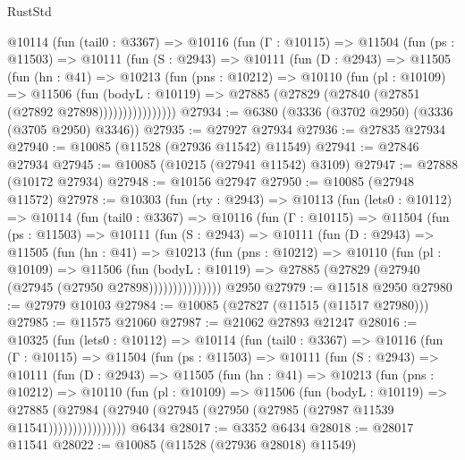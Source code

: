 \begin{lexlean}{RustStd}
\begin{coremodule}
        @10114
          (fun (tail0 : @3367) =>
          @10116
            (fun (Γ : @10115) =>
            @11504
              (fun (ps : @11503) =>
              @10111
                (fun (S : @2943) =>
                @10111
                  (fun (D : @2943) =>
                  @11505
                    (fun (hn : @41) =>
                    @10213
                      (fun (pns : @10212) =>
                      @10110
                        (fun (pl : @10109) =>
                        @11506
                          (fun (bodyL : @10119) =>
                          @27885 (@27829 (@27840 (@27851 (@27892 @27898))))))))))))))))
@27934 := @6380 (@3336 (@3702 @2950) (@3336 (@3705 @2950) @3346))
@27935 := @27927 @27934
@27936 := @27835 @27934
@27940 := @10085 (@11528 (@27936 @11542) @11549)
@27941 := @27846 @27934
@27945 := @10085 (@10215 (@27941 @11542) @3109)
@27947 := @27888 (@10172 @27934)
@27948 := @10156 @27947
@27950 := @10085 (@27948 @11572)
@27978 := @10303
    (fun (rty : @2943) =>
    @10113
      (fun (lets0 : @10112) =>
      @10114
        (fun (tail0 : @3367) =>
        @10116
          (fun (Γ : @10115) =>
          @11504
            (fun (ps : @11503) =>
            @10111
              (fun (S : @2943) =>
              @10111
                (fun (D : @2943) =>
                @11505
                  (fun (hn : @41) =>
                  @10213
                    (fun (pns : @10212) =>
                    @10110
                      (fun (pl : @10109) =>
                      @11506
                        (fun (bodyL : @10119) =>
                        @27885 (@27829 (@27940 (@27945 (@27950 @27898)))))))))))))))
    @2950
@27979 := @11518 @2950
@27980 := @27979 @10103
@27984 := @10085 (@27827 (@11515 (@11517 @27980)))
@27985 := @11575 @21060
@27987 := @21062 @27893 @21247
@28016 := @10325
    (fun (lets0 : @10112) =>
    @10114
      (fun (tail0 : @3367) =>
      @10116
        (fun (Γ : @10115) =>
        @11504
          (fun (ps : @11503) =>
          @10111
            (fun (S : @2943) =>
            @10111
              (fun (D : @2943) =>
              @11505
                (fun (hn : @41) =>
                @10213
                  (fun (pns : @10212) =>
                  @10110
                    (fun (pl : @10109) =>
                    @11506
                      (fun (bodyL : @10119) =>
                      @27885
                        (@27984
                          (@27940 (@27945 (@27950 (@27985 (@27987 @11539 @11541))))))))))))))))
    @6434
@28017 := @3352 @6434
@28018 := @28017 @11541
@28022 := @10085 (@11528 (@27936 @28018) @11549)

\end{coremodule}
\end{lexlean}
